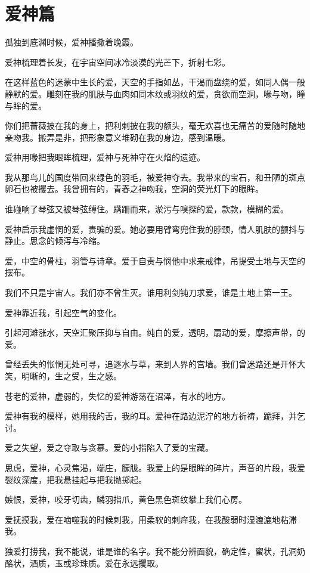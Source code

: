 \documentclass[UTF8]{article}
\begin{document}
\section{爱神篇}
\par 孤独到底渊时候，爱神播撒着晚霞。
\par 爱神梳理着长发，在宇宙空间冰冷淡漠的光芒下，折射七彩。
\par 在这样蓝色的迷蒙中生长的爱，天空的手指如丛，干渴而盘绕的爱，如同人偶一般静默的爱。雕刻在我的肌肤与血肉如同木纹或羽纹的爱，贪欲而空洞，喙与吻，瞳与眸的爱。
\par 你们把蔷薇披在我的身上，把利刺披在我的额头，毫无欢喜也无痛苦的爱随时随地亲吻我。搬弄是非，把形象意义堆砌在我的身边，感到温暖。
\par 爱神用喙把我眼眸梳理，爱神与死神守在火焰的遗迹。
\par 我从那鸟儿的国度带回来绿色的羽毛，被爱神夺去。我带来的宝石，和丑陋的斑点卵石也被攫去。我曾拥有的，青春之神吻我，空洞的荧光灯下的眼眸。
\par 谁碰响了琴弦又被琴弦缚住。蹒跚而来，淤污与嗅探的爱，款款，模糊的爱。
\par 爱神启示我虚惘的爱，责骗的爱。她必要用臂弯兜住我的脖颈，情人肌肤的颤抖与静止。思念的倾泻与冷缩。
\par 爱，中空的骨柱，羽管与诗章。爱于自责与悯他中求来戒律，吊提受土地与天空的摆布。
\par 我们不只是宇宙人。我们亦不曾生灭。谁用利剑钝刀求爱，谁是土地上第一王。
\\[0.6cm]
\par 爱神靠近我，引起空气的变化。
\par 引起河滩涨水，天空汇聚压抑与自由。纯白的爱，透明，扇动的爱，摩擦声带，的爱。
\par 曾经丢失的怅惘无处可寻，追逐水与草，来到人界的宫墙。我们曾迷路还是开怀大笑，明晰的，生之受，生之感。
\par 苍老的爱神，虚弱的，失忆的爱神游荡在沼泽，有水的地方。
\par 爱神有我的模样，她用我的舌，我的耳。爱神在路边泥泞的地方祈祷，跪拜，并乞讨。
\par 爱之失望，爱之夺取与贪慕。爱的小指陷入了爱的宝藏。
\par 思虑，爱神，心灵焦渴，端庄，朦胧。我爱上的是眼眸的碎片，声音的片段，我爱裂纹深度，把我悬挂起与把我抛掷起。
\par 嫉恨，爱神，咬牙切齿，鳞羽指爪，黄色黑色斑纹攀上我们心房。
\par 爱抚摸我，爱在啮噬我的时候刺我，用柔软的刺痒我，在我酸弱时湿漉漉地粘滞我。
\par 独爱打捞我，我不能说，谁是谁的名字。我不能分辨面貌，确定性，蜜状，孔洞奶酪状，酒质，玉或珍珠质。爱在永远攫取。
\end{document}
